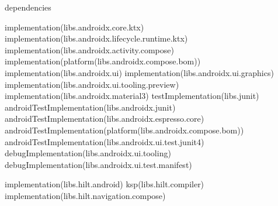 \begin{ktlst}
dependencies {

    implementation(libs.androidx.core.ktx)
    implementation(libs.androidx.lifecycle.runtime.ktx)
    implementation(libs.androidx.activity.compose)
    implementation(platform(libs.androidx.compose.bom))
    implementation(libs.androidx.ui)
    implementation(libs.androidx.ui.graphics)
    implementation(libs.androidx.ui.tooling.preview)
    implementation(libs.androidx.material3)
    testImplementation(libs.junit)
    androidTestImplementation(libs.androidx.junit)
    androidTestImplementation(libs.androidx.espresso.core)
    androidTestImplementation(platform(libs.androidx.compose.bom))
    androidTestImplementation(libs.androidx.ui.test.junit4)
    debugImplementation(libs.androidx.ui.tooling)
    debugImplementation(libs.androidx.ui.test.manifest)

    implementation(libs.hilt.android)
    ksp(libs.hilt.compiler)
    implementation(libs.hilt.navigation.compose)
}
\end{ktlst}